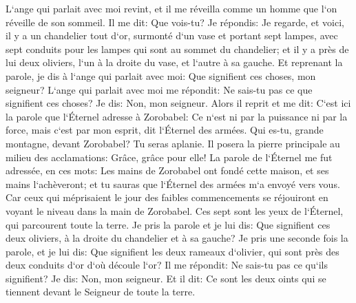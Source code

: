 \verse L`ange qui parlait avec moi revint, et il me réveilla comme un homme que l`on réveille de son sommeil. 
\verse Il me dit: Que vois-tu? Je répondis: Je regarde, et voici, il y a un chandelier tout d`or, surmonté d`un vase et portant sept lampes, avec sept conduits pour les lampes qui sont au sommet du chandelier; 
\verse et il y a près de lui deux oliviers, l`un à la droite du vase, et l`autre à sa gauche. 
\verse Et reprenant la parole, je dis à l`ange qui parlait avec moi: Que signifient ces choses, mon seigneur? 
\verse L`ange qui parlait avec moi me répondit: Ne sais-tu pas ce que signifient ces choses? Je dis: Non, mon seigneur. 
\verse Alors il reprit et me dit: C`est ici la parole que l`Éternel adresse à Zorobabel: Ce n`est ni par la puissance ni par la force, mais c`est par mon esprit, dit l`Éternel des armées. 
\verse Qui es-tu, grande montagne, devant Zorobabel? Tu seras aplanie. Il posera la pierre principale au milieu des acclamations: Grâce, grâce pour elle! 
\verse La parole de l`Éternel me fut adressée, en ces mots: 
\verse Les mains de Zorobabel ont fondé cette maison, et ses mains l`achèveront; et tu sauras que l`Éternel des armées m`a envoyé vers vous. 
\verse Car ceux qui méprisaient le jour des faibles commencements se réjouiront en voyant le niveau dans la main de Zorobabel. Ces sept sont les yeux de l`Éternel, qui parcourent toute la terre. 
\verse Je pris la parole et je lui dis: Que signifient ces deux oliviers, à la droite du chandelier et à sa gauche? 
\verse Je pris une seconde fois la parole, et je lui dis: Que signifient les deux rameaux d`olivier, qui sont près des deux conduits d`or d`où découle l`or? 
\verse Il me répondit: Ne sais-tu pas ce qu`ils signifient? Je dis: Non, mon seigneur. 
\verse Et il dit: Ce sont les deux oints qui se tiennent devant le Seigneur de toute la terre. 

\chapter{}

